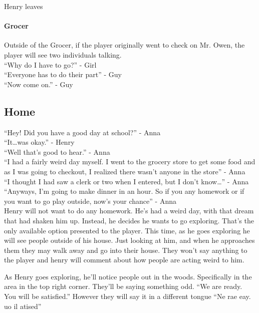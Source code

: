 \documentclass[12pt, a4paper, titlepage]{article}
\begin{document}
	Henry leaves

        \paragraph{Grocer}
        Outside of the Grocer, if the player originally went to check on Mr. Owen, the player will see two individuals talking.\\

	``Why do I have to go?'' - Girl\\
	``Everyone has to do their part'' - Guy\\
	``Now come on.'' - Guy\\        

        \subsection{Home}

            ``Hey! Did you have a good day at school?'' - Anna\\
            ``It\dots was okay.'' - Henry\\
            ``Well that's good to hear.'' - Anna\\
            ``I had a fairly weird day myself. I went to the grocery store to get some food and as I was going to checkout, I realized there wasn't anyone in the store'' - Anna\\
            ``I thought I had saw a clerk or two when I entered, but I don't know\ldots'' - Anna\\
            ``Anyways, I'm going to make dinner in an hour. So if you any homework or if you want to go play outside, now's your chance'' - Anna\\

            Henry will not want to do any homework. He's had a weird day, with that dream that had shaken him up. Instead, he decides he wants to go exploring. That's the only available 		   option presented to the player. This time, as he goes exploring he will see people outside of his house. Just looking at him, and when he approaches them they may walk away 		   and go into their house. They won't say anything to the player and henry will comment about how people are acting weird to him.
            
            As Henry goes exploring, he'll notice people out in the woods. Specifically in the area in the top right corner. They'll be saying something odd. ``We are ready. You will be 			   satisfied.'' However they will say it in a different tongue ``Ne rae eay. uo il atised''
            
\end{document}
